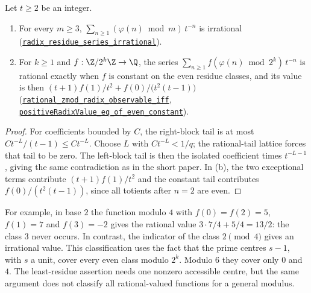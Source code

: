 \begin{prop}
\label{prop:radixresidue}
Let $t\ge2$ be an integer.
\begin{enumerate}[label=(\alph*),leftmargin=*]
\item For every $m\ge3$, $\sum_{n\ge1}(\varphi(n)\bmod m)\,t^{-n}$ is
  irrational
  (\href{https://github.com/wcook04/plectis-erdos/blob/24edbddbe2bd68e920327a701aad0b9dd0d69675/lean/ErdosProblems/Erdos249/PaperCompleteR7/RationalIntegerRadixClassification.lean\#L128}{\texttt{radix\_residue\_series\_irrational}}).
\item For $k\ge1$ and $f:\Z/2^k\Z\to\Q$, the series
  $\sum_{n\ge1}f(\varphi(n)\bmod2^k)\,t^{-n}$ is rational exactly when $f$
  is constant on the even residue classes, and its value is then
  $(t+1)f(1)/t^2+f(0)/\bigl(t^2(t-1)\bigr)$
  (\href{https://github.com/wcook04/plectis-erdos/blob/24edbddbe2bd68e920327a701aad0b9dd0d69675/lean/ErdosProblems/Erdos249/PaperCompleteR7/RationalIntegerRadixClassification.lean\#L145}{\texttt{rational\_zmod\_radix\_observable\_iff}},
  \href{https://github.com/wcook04/plectis-erdos/blob/24edbddbe2bd68e920327a701aad0b9dd0d69675/lean/ErdosProblems/Erdos249/PaperCompleteR7/IntegerRadixObservables.lean\#L303}{\texttt{positiveRadixValue\_eq\_of\_even\_constant}}).
\end{enumerate}
\end{prop}

\begin{proof}
For coefficients bounded by $C$, the right-block tail is at most
$Ct^{-L}/(t-1)\le Ct^{-L}$. Choose $L$ with $Ct^{-L}<1/q$;
the rational-tail lattice forces that tail to be zero. The left-block
tail is then the isolated coefficient times $t^{-L-1}$, giving the
same contradiction as in the short paper. In (b), the two exceptional
terms contribute $(t+1)f(1)/t^2$ and the constant tail contributes
$f(0)/(t^2(t-1))$, since all totients after $n=2$ are even.
\end{proof}
For example, in base $2$ the function modulo $4$ with
$f(0)=f(2)=5$, $f(1)=7$ and $f(3)=-2$ gives the rational value
$3\cdot7/4+5/4=13/2$: the class $3$ never occurs. In contrast,
the indicator of the class $2\pmod4$ gives an irrational value.
This classification uses the fact that the prime centres $s-1$,
with $s$ a unit, cover every even class modulo $2^k$. Modulo $6$
they cover only $0$ and $4$. The least-residue assertion needs one
nonzero accessible centre, but the same argument does not classify
all rational-valued functions for a general modulus.

